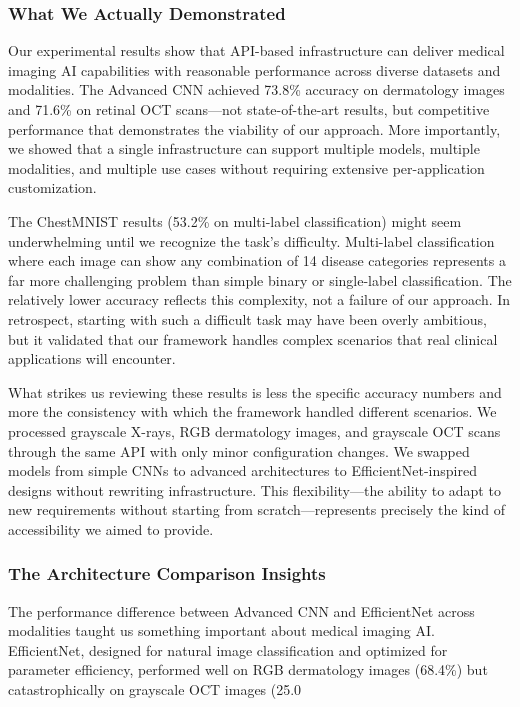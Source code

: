 \documentclass[12pt,a4paper]{article}
\begin{document}
\subsubsection{What We Actually Demonstrated}

Our experimental results show that API-based infrastructure can deliver medical imaging AI capabilities with reasonable performance across diverse datasets and modalities. The Advanced CNN achieved 73.8\% accuracy on dermatology images and 71.6\% on retinal OCT scans—not state-of-the-art results, but competitive performance that demonstrates the viability of our approach. More importantly, we showed that a single infrastructure can support multiple models, multiple modalities, and multiple use cases without requiring extensive per-application customization.

The ChestMNIST results (53.2\% on multi-label classification) might seem underwhelming until we recognize the task's difficulty. Multi-label classification where each image can show any combination of 14 disease categories represents a far more challenging problem than simple binary or single-label classification. The relatively lower accuracy reflects this complexity, not a failure of our approach. In retrospect, starting with such a difficult task may have been overly ambitious, but it validated that our framework handles complex scenarios that real clinical applications will encounter.

What strikes us reviewing these results is less the specific accuracy numbers and more the consistency with which the framework handled different scenarios. We processed grayscale X-rays, RGB dermatology images, and grayscale OCT scans through the same API with only minor configuration changes. We swapped models from simple CNNs to advanced architectures to EfficientNet-inspired designs without rewriting infrastructure. This flexibility—the ability to adapt to new requirements without starting from scratch—represents precisely the kind of accessibility we aimed to provide.

\subsubsection{The Architecture Comparison Insights}

The performance difference between Advanced CNN and EfficientNet across modalities taught us something important about medical imaging AI. EfficientNet, designed for natural image classification and optimized for parameter efficiency, performed well on RGB dermatology images (68.4\%) but catastrophically on grayscale OCT images (25.0%
\end{document}

